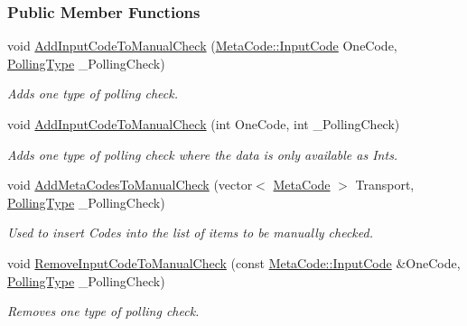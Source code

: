 \subsubsection*{Public Member Functions}
\begin{DoxyCompactItemize}
\item 
void \hyperlink{structphys_1_1internal_1_1EventManagerInternalData_abf8c7b472e4b19a0c0243dcaf49a38ae}{AddInputCodeToManualCheck} (\hyperlink{classphys_1_1MetaCode_a3e501cbb5bf0f6f1fdb7211465bda8d8}{MetaCode::InputCode} OneCode, \hyperlink{structphys_1_1internal_1_1EventManagerInternalData_ab9ab8380b84448aacf46a63050e159af}{PollingType} \_\-PollingCheck)
\begin{DoxyCompactList}\small\item\em Adds one type of polling check. \item\end{DoxyCompactList}\item 
void \hyperlink{structphys_1_1internal_1_1EventManagerInternalData_a38365985c350611884fdd3eca7d5acd5}{AddInputCodeToManualCheck} (int OneCode, int \_\-PollingCheck)
\begin{DoxyCompactList}\small\item\em Adds one type of polling check where the data is only available as Ints. \item\end{DoxyCompactList}\item 
void \hyperlink{structphys_1_1internal_1_1EventManagerInternalData_ac2e4044e2fc6eb2df18a3e274c175065}{AddMetaCodesToManualCheck} (vector$<$ \hyperlink{classphys_1_1MetaCode}{MetaCode} $>$ Transport, \hyperlink{structphys_1_1internal_1_1EventManagerInternalData_ab9ab8380b84448aacf46a63050e159af}{PollingType} \_\-PollingCheck)
\begin{DoxyCompactList}\small\item\em Used to insert Codes into the list of items to be manually checked. \item\end{DoxyCompactList}\item 
void \hyperlink{structphys_1_1internal_1_1EventManagerInternalData_aadc9e786da13f2c669fc7e054d8fbf37}{RemoveInputCodeToManualCheck} (const \hyperlink{classphys_1_1MetaCode_a3e501cbb5bf0f6f1fdb7211465bda8d8}{MetaCode::InputCode} \&OneCode, \hyperlink{structphys_1_1internal_1_1EventManagerInternalData_ab9ab8380b84448aacf46a63050e159af}{PollingType} \_\-PollingCheck)
\begin{DoxyCompactList}\small\item\em Removes one type of polling check. \item\end{DoxyCompactList}\item 

\end{DoxyCompactItemize}
